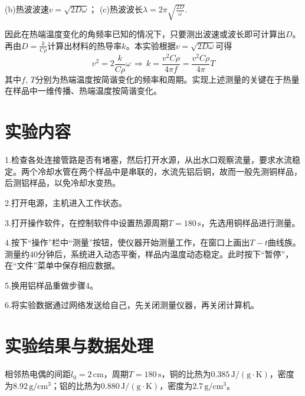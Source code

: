 \documentclass[UTF-8,twoside,cs4size]{ctexart}
\begin{document}
	{\kaishu (b)热波波速$ v=\sqrt{2D\omega} $；}	
	{\kaishu (c)热波波长$ \lambda=2\pi\sqrt{\frac{2D}{\omega}} $.}
	
	因此在热端温度变化的角频率已知的情况下，只要测出波速或波长即可计算出$ D $。再由$ D=\frac{k}{C\rho} $计算出材料的热导率$ k $。本实验根据$ v=\sqrt{2D\omega} $可得
	\[v^2=2\frac{k}{C\rho}\omega\,\Longrightarrow\,k=\frac{v^2C\rho}{4\pi f}=\frac{v^2C\rho}{4\pi}T\]
	其中$ f,\,T $分别为热端温度按简谐变化的频率和周期。实现上述测量的关键在于热量在样品中一维传播、热端温度按简谐变化。
	
	\section{实验内容}
	1.检查各处连接管路是否有堵塞，然后打开水源，从出水口观察流量，要求水流稳定。两个冷却水管在两个样品中是串联的，水流先铝后铜，故而一般先测铜样品，后测铝样品，以免冷却水变热。
	
	2.打开电源，主机进入工作状态。
	
	3.打开操作软件，在控制软件中设置热源周期$ T=180\,\mathrm s $，先选用铜样品进行测量。
	
	4.按下“操作”栏中“测量”按钮，使仪器开始测量工作，在窗口上画出$ T-t $曲线族。测量约40分钟后，系统进入动态平衡，样品内温度动态稳定。此时按下“暂停”，在“文件”菜单中保存相应数据。
	
	5.换用铝样品重做步骤4。
	
	6.将实验数据通过网络发送给自己，先关闭测量仪器，再关闭计算机。
	
	\section{实验结果与数据处理}
	相邻热电偶的间距$ l_0=2\,\mathrm{cm} $，周期$ T=180\,\mathrm{s} $，铜的比热为$ 0.385\,\mathrm{J/(g\cdot K)} $，密度为$ 8.92\,\mathrm{g/cm^3} $；铝的比热为$ 0.880\,\mathrm{J/(g\cdot K)} $，密度为$ 2.7\,\mathrm{g/cm^3} $。
\end{document}
